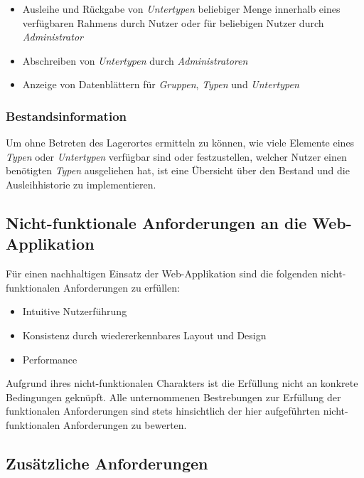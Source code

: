 \documentclass[
]{article}
\providecommand{\tightlist}{%
  \setlength{\itemsep}{0pt}\setlength{\parskip}{0pt}}
\begin{document}
\begin{itemize}
\tightlist
\item
  Ausleihe und Rückgabe von \emph{Untertypen} beliebiger Menge innerhalb eines verfügbaren Rahmens durch Nutzer oder für beliebigen Nutzer durch \emph{Administrator}
\item
  Abschreiben von \emph{Untertypen} durch \emph{Administratoren}
\item
  Anzeige von Datenblättern für \emph{Gruppen}, \emph{Typen} und \emph{Untertypen}
\end{itemize}

\hypertarget{bestandsinformation}{%
\subsubsection{Bestandsinformation}\label{bestandsinformation}}

Um ohne Betreten des Lagerortes ermitteln zu können, wie viele Elemente eines \emph{Typen} oder \emph{Untertypen} verfügbar sind oder festzustellen, welcher Nutzer einen benötigten \emph{Typen} ausgeliehen hat, ist eine Übersicht über den Bestand und die Ausleihhistorie zu implementieren.

\hypertarget{nicht-funktionale-anforderungen-an-die-web-applikation}{%
\subsection{Nicht-funktionale Anforderungen an die Web-Applikation}\label{nicht-funktionale-anforderungen-an-die-web-applikation}}

Für einen nachhaltigen Einsatz der Web-Applikation sind die folgenden nicht-funktionalen Anforderungen zu erfüllen:

\begin{itemize}
\tightlist
\item
  Intuitive Nutzerführung
\item
  Konsistenz durch wiedererkennbares Layout und Design
\item
  Performance
\end{itemize}

Aufgrund ihres nicht-funktionalen Charakters ist die Erfüllung nicht an konkrete Bedingungen geknüpft. Alle unternommenen Bestrebungen zur Erfüllung der funktionalen Anforderungen sind stets hinsichtlich der hier aufgeführten nicht-funktionalen Anforderungen zu bewerten.

\hypertarget{zusuxe4tzliche-anforderungen}{%
\subsection{Zusätzliche Anforderungen}\label{zusuxe4tzliche-anforderungen}}
\end{document}
